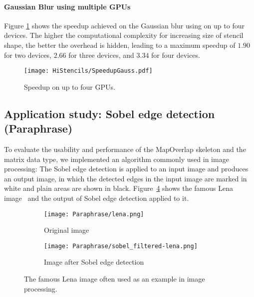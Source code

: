 \paragraph{Gaussian Blur using multiple GPUs}

Figure \ref{fig:GaussMult} shows the speedup achieved on the Gaussian blur using  on up to four devices.
The higher the computational complexity for increasing size of stencil shape, the better the overhead is hidden, leading to a maximum speedup of $1.90$ for two devices, $2.66$ for three devices, and $3.34$ for four devices.
\begin{figure}
	\centering
	\texttt{[image: HiStencils/SpeedupGauss.pdf]}
	\caption{Speedup on up to four GPUs.}
	\label{fig:GaussMult}
\end{figure} 


\subsection{Application study: Sobel edge detection (Paraphrase)}
\label{sec:application_study}
To evaluate the  usability and performance of the MapOverlap skeleton and the matrix data type, we implemented an algorithm commonly used in image processing:
The Sobel edge detection is applied to an input image and produces an output image, in which the detected edges in the input image are marked in white and plain areas are shown in black.
Figure~\ref{fig:lena} shows the famous Lena image~\cite{Lena} and the output of Sobel edge detection applied to it.

\begin{figure}[tb]
  \centering
  \begin{subfigure}[t]{.45\textwidth}
    \texttt{[image: Paraphrase/lena.png]}
    \caption{Original image}
    \label{fig:lena:orig}
  \end{subfigure}
  \hfill
  \begin{subfigure}[t]{.45\textwidth}
    \texttt{[image: Paraphrase/sobel\_filtered-lena.png]}
    \caption{Image after Sobel edge detection}
    \label{fig:lena:sobel}
  \end{subfigure}
  \caption{The famous Lena image often used as an example in image processing.}
  \label{fig:lena}
\end{figure}

